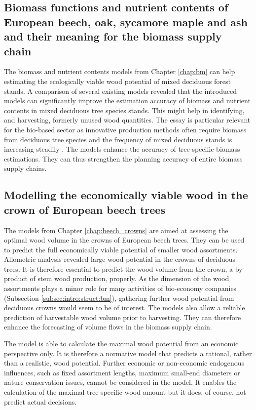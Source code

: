 \subsection{Biomass functions and nutrient contents of European beech, oak, sycamore maple and ash and their meaning for the biomass supply chain}
\label{subsec:discussion:struct:bm}
The biomass and nutrient contents models from Chapter \ref{chap:bm} can help estimating the ecologically viable wood potential of mixed deciduous forest stands. A comparison of several existing models revealed that the introduced models can significantly improve the estimation accuracy of biomass and nutrient contents in mixed deciduous tree species stands. This might help in identifying, and harvesting, formerly unused wood quantities. The essay is particular relevant for the bio-based sector as innovative production methods often require biomass from deciduous tree species \citep[p. 1]{auer_2016} and the frequency of mixed deciduous stands is increasing steadily \citep{ti_2014}. The models enhance the accuracy of tree-specific biomass estimations. They can thus strengthen the planning accuracy of entire biomass supply chains.

\subsection{Modelling the economically viable wood in the crown of European beech trees}
\label{subsec:discussion:struct:beech_crowns}
The models from Chapter \ref{chap:beech_crowns} are aimed at assessing the optimal wood volume in the crowns of European beech trees. They can be used to predict the full economically viable potential of smaller wood assortments. Allometric analysis revealed large wood potential in the crowns of deciduous trees. It is therefore essential to predict the wood volume from the crown, a by-product of stem wood production, properly. As the dimension of the wood assortments plays a minor role for many activities of bio-economy companies (Subsection \ref{subsec:intro:struct:bm}), gathering further wood potential from deciduous crowns would seem to be of interest. The models also allow a reliable prediction of harvestable wood volume prior to harvesting. They can therefore enhance the forecasting of volume flows in the biomass supply chain.

The model is able to calculate the maximal wood potential from an economic perspective only. It is therefore a normative model that predicts a rational, rather than a realistic, wood potential. Further economic or non-economic endogenous influences, such as fixed assortment lengths, maximum small-end diameters or nature conservation issues, cannot be considered in the model. It enables the calculation of the maximal tree-specific wood amount but it does, of course, not predict actual decisions.

